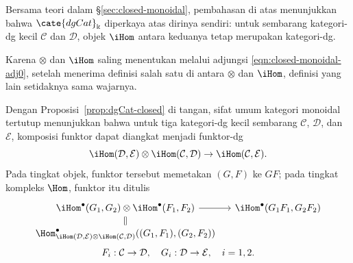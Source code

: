 Bersama teori dalam \S\ref{sec:closed-monoidal}, pembahasan di atas
menunjukkan bahwa $\cate{dgCat}_{\Bbbk}$ diperkaya atas dirinya sendiri:
untuk sembarang kategori-dg kecil $\mathcal{C}$ dan $\mathcal{D}$, objek
$\iHom$ antara keduanya tetap merupakan kategori-dg.

Karena $\otimes$ dan $\iHom$ saling menentukan melalui adjungsi
\eqref{eqn:closed-monoidal-adj0}, setelah menerima definisi salah satu di
antara $\otimes$ dan $\iHom$, definisi yang lain setidaknya sama wajarnya.

\begin{remark}
	Dengan Proposisi~\ref{prop:dgCat-closed} di tangan, sifat umum kategori
	monoidal tertutup menunjukkan bahwa untuk tiga kategori-dg kecil sembarang
	$\mathcal{C}$, $\mathcal{D}$, dan $\mathcal{E}$, komposisi funktor dapat
	diangkat menjadi funktor-dg
	\[ \iHom(\mathcal{D}, \mathcal{E}) \otimes \iHom(\mathcal{C}, \mathcal{D}) \to \iHom(\mathcal{C}, \mathcal{E}). \]
	Pada tingkat objek, funktor tersebut memetakan $(G,F)$ ke $GF$; pada
	tingkat kompleks $\Hom$, funktor itu ditulis
	\begin{equation}\begin{gathered}\label{eqn:dgCat-fct-compose}
		\begin{tikzcd}[row sep=small, column sep=small]
			\iHom^\bullet(G_1, G_2) \otimes \iHom^\bullet(F_1, F_2) \arrow[r] \arrow[equal, d] & \iHom^\bullet(G_1 F_1, G_2 F_2) \\
			\Hom^\bullet_{ \iHom(\mathcal{D}, \mathcal{E}) \otimes \iHom(\mathcal{C}, \mathcal{D}) }((G_1, F_1), (G_2, F_2)) &
		\end{tikzcd} \\
		F_i: \mathcal{C} \to \mathcal{D}, \quad G_i: \mathcal{D} \to \mathcal{E}, \quad i = 1, 2 .
	\end{gathered}\end{equation}


\end{remark}
